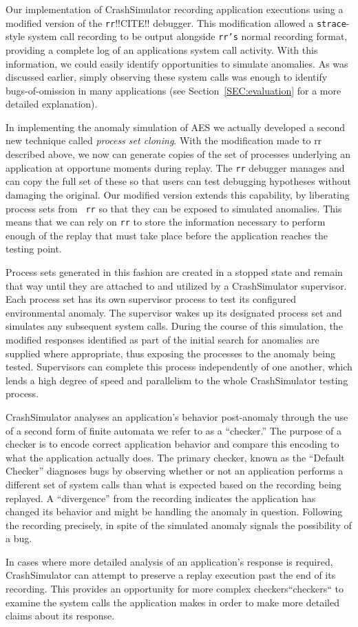 Our implementation of CrashSimulator 
recording application executions
using a modified version of the {\tt rr}!!CITE!!
debugger.  This modification allowed
a {\tt strace}-style
system call recording to be output alongside {\tt rr's} normal recording
format, providing
a complete log of an applications system call activity.
With this information, we could
easily identify opportunities to simulate anomalies.  As was
discussed earlier, simply observing these system calls was enough to
identify bugs-of-omission in many applications
(see Section~\ref{SEC:evaluation} for a more detailed explanation).

In implementing the anomaly simulation of AES
we actually developed
a second new technique
called {\it process set cloning}.
With the modification made to rr described above,
we now can generate copies of the set of
processes underlying an application at opportune moments during replay.
The {\tt rr} debugger manages
and can copy
the full set of these
so that users can test debugging
hypotheses without damaging the original.
Our modified version
extends this capability, by liberating process sets from {\tt
rr} so that they can be exposed to simulated anomalies.
This means that we can rely on {\tt rr}
to store the information necessary to perform enough of the
replay that must take place before the application reaches the
testing point.

Process sets generated in this fashion are created in a stopped state and
remain that way until they are attached to and utilized by a CrashSimulator
supervisor.  Each process set has its own supervisor process to test
its configured environmental anomaly.  The
supervisor wakes up its designated process set
and simulates any
subsequent system calls.
During the course of this simulation, the modified responses identified
as part of the initial search for anomalies
are supplied where appropriate,
thus exposing the processes to the
anomaly being tested.
Supervisors can complete this
process independently of one another, which lends a
high degree of speed and
parallelism to the whole CrashSimulator testing process.

CrashSimulator analyses an application's behavior post-anomaly through the
use of a second form of finite automata we refer to as a ``checker.''  The
purpose of a checker is to encode correct application behavior and compare
this encoding to what the application actually does.
The primary checker, known as the ``Default Checker''
diagnoses bugs
by observing whether or not an application
performs a different set of system calls than what is expected based on the
recording being replayed.  A ``divergence'' from the recording indicates
the application has changed its behavior and might be handling
the anomaly in question.  Following the recording precisely, in spite of
the simulated anomaly signals the possibility of a bug.

In cases where more detailed analysis of an application's response
is required, CrashSimulator can attempt to preserve a replay execution
past the end of its recording.  This provides an opportunity for
more complex checkers``checkers`` to examine
the system calls the application makes in order to make more detailed claims about
its response.
